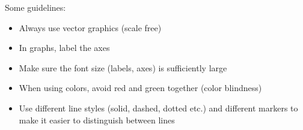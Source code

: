 \documentclass[12pt,twoside]{article}
\begin{document}

Some guidelines:
\begin{itemize}
\item Always use vector graphics (scale free)
\item In graphs, label the axes
\item Make sure the font size (labels, axes) is sufficiently large
\item When using colors, avoid red and green together (color blindness)
\item Use different line styles (solid, dashed, dotted etc.) and different markers to make it easier to distinguish between lines
\end{itemize}

\end{document}
